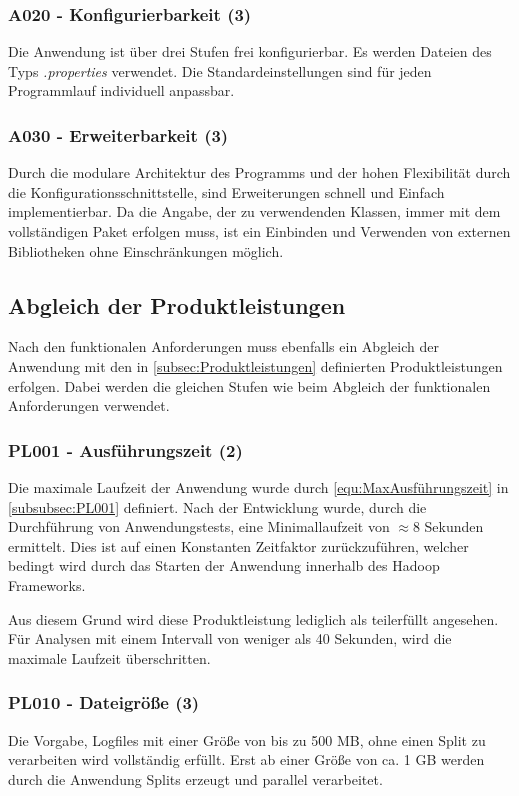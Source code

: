 \subsubsection{A020 - Konfigurierbarkeit (3)}
Die Anwendung ist über drei Stufen frei konfigurierbar. Es werden Dateien des Typs \textit{.properties} verwendet. Die Standardeinstellungen sind für jeden Programmlauf individuell anpassbar.

\subsubsection{A030 - Erweiterbarkeit (3)}
Durch die modulare Architektur des Programms und der hohen Flexibilität durch die Konfigurationsschnittstelle, sind Erweiterungen schnell und Einfach implementierbar. Da die Angabe, der zu verwendenden Klassen, immer mit dem vollständigen Paket erfolgen muss, ist ein Einbinden und Verwenden von externen Bibliotheken ohne Einschränkungen möglich.

\subsection{Abgleich der Produktleistungen}
Nach den funktionalen Anforderungen muss ebenfalls ein Abgleich der Anwendung mit den in \autoref{subsec:Produktleistungen} definierten Produktleistungen erfolgen. Dabei werden die gleichen Stufen wie beim Abgleich der funktionalen Anforderungen verwendet.

\subsubsection{PL001 - Ausführungszeit (2)}
Die maximale Laufzeit der Anwendung wurde durch \autoref{equ:MaxAusführungszeit} in \autoref{subsubsec:PL001} definiert. Nach der Entwicklung wurde, durch die Durchführung von Anwendungstests, eine Minimallaufzeit von $\approx 8$ Sekunden ermittelt. Dies ist auf einen Konstanten Zeitfaktor zurückzuführen, welcher bedingt wird durch das Starten der Anwendung innerhalb des Hadoop Frameworks.

Aus diesem Grund wird diese Produktleistung lediglich als teilerfüllt angesehen. Für Analysen mit einem Intervall von weniger als 40 Sekunden, wird die maximale Laufzeit überschritten.

\subsubsection{PL010 - Dateigröße (3)}
Die Vorgabe, Logfiles mit einer Größe von bis zu 500 \ac{MB}, ohne einen Split zu verarbeiten wird vollständig erfüllt. Erst ab einer Größe von ca. 1 \ac{GB} werden durch die Anwendung Splits erzeugt und parallel verarbeitet. 

